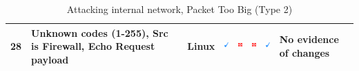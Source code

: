 \documentclass[12pt]{article}
\begin{document}
\begin{savenotes}
\begin{table}[!h]
{{\begin{tabular}{|C{1.0cm}|L{6.0cm}|C{1.5cm}|C{1.0cm}|C{1.0cm}|C{1.0cm}|C{1.0cm}|L{7.0cm}|}
28&Unknown codes (1-255), Src is Firewall, Echo Request payload&Linux&\includegraphics[width=4mm, height=4mm]{ok}&\includegraphics[width=4mm, height=4mm]{notok}&\includegraphics[width=4mm, height=4mm]{notok}&\includegraphics[width=4mm, height=4mm]{ok}&No evidence of changes\\
\hline
\end{tabular}}}
\caption{Attacking internal network, Packet Too Big (Type 2)}
\label{table:attackInternalResults2}
\end{table}
\end{savenotes}
\end{document}
